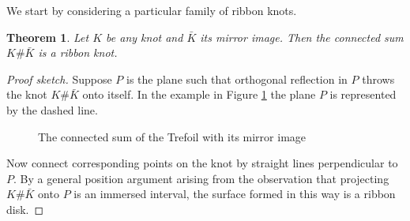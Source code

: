 \documentclass{article}
\newtheorem{theorem}{Theorem}[section]
\theoremstyle{definition}
\begin{document}
We start by considering a particular family of ribbon knots.

\begin{theorem}\label{thm:connected-sum-ribbon}
Let $K$ be any knot and $\bar{K}$ its mirror image. Then the connected sum $K\#\bar{K}$ is a ribbon knot.
\end{theorem}

\begin{proof}[Proof sketch]
Suppose $P$ is the plane such that orthogonal reflection in $P$ throws the knot $K\#\bar{K}$ onto itself. In the example in Figure \ref{fig:connected-sum-figure-8} the plane $P$ is represented by the dashed line. 

\begin{figure}[htb]
\centering
{}
\caption{The connected sum of the Trefoil with its mirror image}
\label{fig:connected-sum-figure-8}
\end{figure}

Now connect corresponding points on the knot by straight lines perpendicular to $P$. By a general position argument arising from the observation that projecting $K\#\bar{K}$ onto $P$ is an immersed interval, the surface formed in this way is a ribbon disk.
\end{proof}
\end{document}

